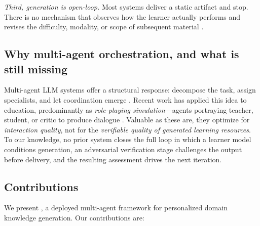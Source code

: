 \emph{Third, generation is open-loop.} Most systems deliver a static artifact
and stop. There is no mechanism that observes how the learner actually
performs and revises the difficulty, modality, or scope of subsequent
material \cite{doroudi2019instruction}.

\subsection{Why multi-agent orchestration, and what is still missing}

Multi-agent LLM systems offer a structural response: decompose the task,
assign specialists, and let coordination emerge
\cite{hong2023metagpt,qian2023chatdev,wu2023autogen}. Recent work has applied
this idea to education, predominantly as \emph{role-playing simulation}---agents
portraying teacher, student, or critic to produce dialogue
\cite{zhang2024simulating,dan2023educhat}. Valuable as these are, they
optimize for \emph{interaction quality}, not for the \emph{verifiable quality
of generated learning resources}. To our knowledge, no prior system closes the
full loop in which a learner model conditions generation, an adversarial
verification stage challenges the output before delivery, and the resulting
assessment drives the next iteration.

\subsection{Contributions}

We present \sysname{}, a deployed multi-agent framework for personalized
domain knowledge generation. Our contributions are:

